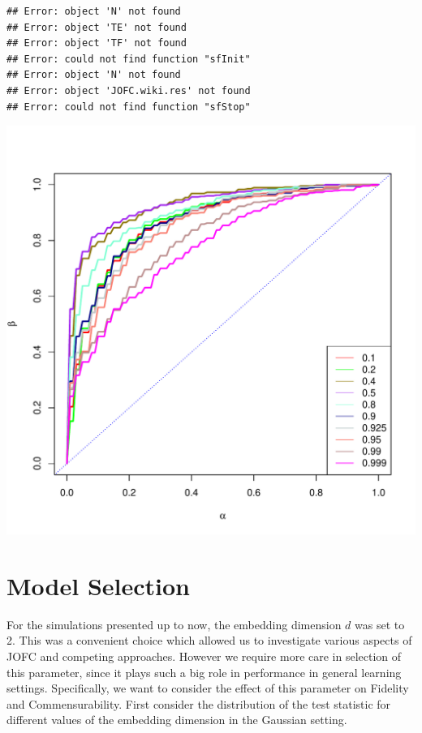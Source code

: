 \documentclass[11pt]{article} %
\begin{document}
\begin{knitrout}
\color{fgcolor}\begin{kframe}
\begin{verbatim}
## Error: object 'N' not found
## Error: object 'TE' not found
## Error: object 'TF' not found
## Error: could not find function "sfInit"
## Error: object 'N' not found
## Error: object 'JOFC.wiki.res' not found
## Error: could not find function "sfStop"
\end{verbatim}
\end{kframe}
\end{knitrout}


\begin{knitrout}
\color{fgcolor}\includegraphics{graphs/FidCommPaperwiki-two-cond-plot} 
\end{knitrout}



\section{Model Selection}
For the simulations presented up to now, the embedding dimension $d$ was set to 2. This was a convenient choice which allowed us to investigate various aspects of JOFC and competing approaches.
However we require  more care in selection of this parameter, since it plays such a big role in performance in general learning settings. Specifically, we want to consider the effect of this parameter on Fidelity and Commensurability.
First consider the distribution of the test statistic for different values of the embedding dimension in the Gaussian setting.
\end{document}
